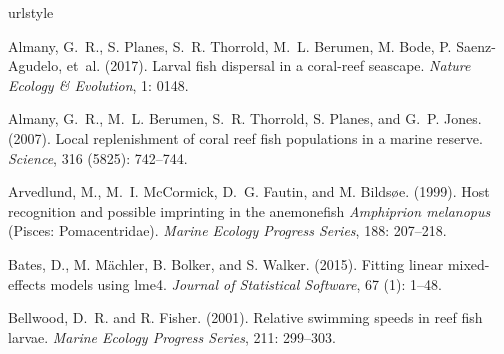 \documentclass[12pt, oneside]{article}   	%
\begin{document}
\newcommand{\noop}[1]{}
\begin{thebibliography}{66}
\providecommand{\natexlab}[1]{#1}
\providecommand{\url}[1]{\texttt{#1}}
\expandafter\ifx\csname urlstyle\endcsname\relax
  \providecommand{\doi}[1]{doi: #1}\else
  \providecommand{\doi}{doi: \begingroup \urlstyle{rm}\Url}\fi

Almany, G.~R., S. Planes, S.~R. Thorrold, M.~L. Berumen, M. Bode, P. Saenz-Agudelo, et~al. (2017).
\newblock Larval fish dispersal in a coral-reef seascape.
\newblock \emph{Nature Ecology \& Evolution}, 1: 0148.

Almany, G.~R., M.~L. Berumen, S.~R. Thorrold, S. Planes, and G.~P. Jones. (2007).
\newblock Local replenishment of coral reef fish populations in a marine reserve.
\newblock \emph{Science}, 316 (5825): 742--744.

Arvedlund, M., M.~I. McCormick, D.~G. Fautin, and M. Bilds{\o}e. (1999).
\newblock Host recognition and possible imprinting in the anemonefish
  \textit{Amphiprion melanopus} (Pisces: Pomacentridae).
\newblock \emph{Marine Ecology Progress Series}, 188: 207--218.


Bates, D., M. M{\"a}chler, B. Bolker, and S. Walker. (2015).
\newblock Fitting linear mixed-effects models using {lme4}.
\newblock \emph{Journal of Statistical Software}, 67 (1):
  1--48.

Bellwood, D.~R. and R. Fisher. (2001).
\newblock Relative swimming speeds in reef fish larvae.
\newblock \emph{Marine Ecology Progress Series}, 211: 299--303.


\end{thebibliography}
\end{document}
